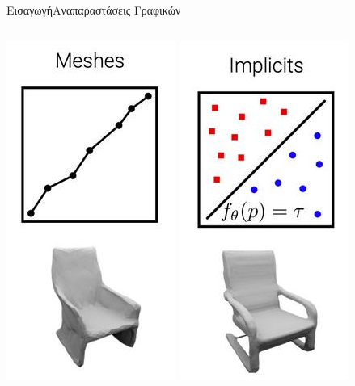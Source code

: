 \documentclass[10pt]{beamer}
\begin{document}
\begin{frame}{Εισαγωγή}{Αναπαραστάσεις Γραφικών}
\begin{columns}
    \includegraphics[height = .5\textheight]{images/mesh.jpg}  \pause
    \includegraphics[height = .5\textheight]{images/implicits.jpg} 
\end{columns}    
\end{frame}
\end{document}
